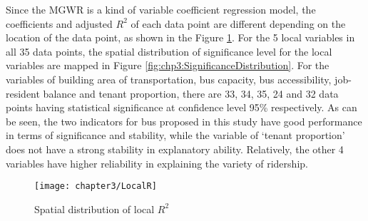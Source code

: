 %
Since the MGWR is a kind of variable coefficient regression model, the coefficients and adjusted $R^2$ of each data point are different depending on the location of the data point, as shown in the Figure \ref{fig:chp3:LocalR}. For the 5 local variables in all 35 data points, the spatial distribution of significance level for the local variables are mapped in Figure \ref{fig:chp3:SignificanceDistribution}. For the variables of building area of transportation, bus capacity, bus accessibility, job-resident balance and tenant proportion, there are 33, 34, 35, 24 and 32 data points having statistical significance at confidence level 95\% respectively. As can be seen, the two indicators for bus proposed in this study have good performance in terms of significance and stability, while the variable of ‘tenant proportion’ does not have a strong stability in explanatory ability. Relatively, the other 4 variables have higher reliability in explaining the variety of ridership.

\begin{figure}[htbp]
	\centering
	\normalsize
	\texttt{[image: chapter3/LocalR]}
	\caption{Spatial distribution of local $R^2$}
	\label{fig:chp3:LocalR}
\end{figure}


